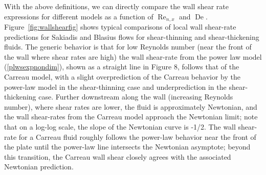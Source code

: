 \documentclass[lineno]{JFM-FLM_Au}
\begin{document}
With the above definitions, we can directly compare the wall shear rate expressions for different models as a function of $\operatorname{Re}_{n, x}$ and $\operatorname{De}$. Figure~\ref{fig:wallshearfig} shows typical comparisons of local wall shear-rate predictions for Sakiadis and Blasius flows for shear-thinning and shear-thickening fluids. The generic behavior is that for low Reynolds number (near the front of the wall where shear rates are high) the wall shear-rate from the power law model (\ref{plwsexpnondim}), shown as a straight line in Figure 8, follows that of the Carreau model, with a slight overprediction of the Carreau behavior by the power-law model in the shear-thinning case and underprediction in the shear-thickening case. Further downstream along the wall (increasing Reynolds number), where shear rates are lower, the fluid is approximately Newtonian, and the wall shear-rates from the Carreau model approach the Newtonian limit; note that on a log-log scale, the slope of the  Newtonian curve is -1/2. The wall shear-rate for a Carreau fluid roughly follows the power-law behavior near the front of the plate until the power-law line intersects the Newtonian asymptote; beyond this transition, the Carreau wall shear closely agrees with the associated Newtonian prediction.
\end{document}
